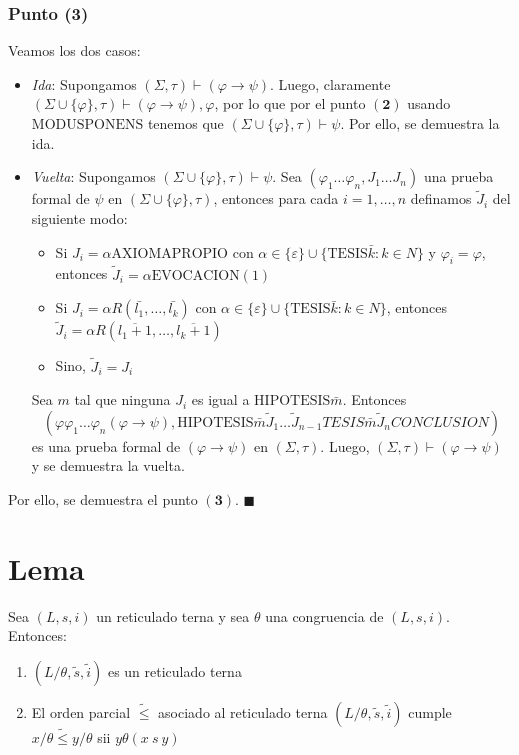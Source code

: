 \documentclass{article}
\begin{document}
\subsubsection*{Punto (3)}
Veamos los dos casos:
\begin{itemize}
  \item \textit{Ida}: Supongamos $(\Sigma,\tau)\vdash(\varphi\to\psi)$. Luego, claramente $(\Sigma\cup\{\varphi\},\tau)\vdash(\varphi\to\psi),\varphi$, por lo que por el punto $\mathbf{(2)}$ usando $\text{MODUSPONENS}$ tenemos que $(\Sigma\cup\{\varphi\},\tau)\vdash\psi$. Por ello, se demuestra la ida.
  \item \textit{Vuelta}: Supongamos $(\Sigma\cup\{\varphi\},\tau)\vdash\psi$. Sea $(\varphi_1\dots\varphi_n,J_1\dots J_n)$ una prueba formal de $\psi$ en $(\Sigma\cup\{\varphi\},\tau)$, entonces para cada $i=1,\dots,n$ definamos $\tilde{J}_i$ del siguiente modo:
        \begin{itemize}
          \item Si $J_i=\alpha\text{AXIOMAPROPIO}$ con $\alpha\in\{\varepsilon\}\cup\{\text{TESIS}\bar{k}:k\in N\}$ y $\varphi_i=\varphi$, entonces $\tilde{J}_i=\alpha\text{EVOCACION}(1)$
          \item Si $J_i=\alpha R(\bar{l_1},\dots,\bar{l_k})$ con $\alpha\in\{\varepsilon\}\cup\{\text{TESIS}\bar{k}:k\in N\}$, entonces $\tilde{J}_i=\alpha R(\overline{l_1+1},\dots,\overline{l_k+1})$
          \item Sino, $\tilde{J}_i=J_i$
        \end{itemize}
        Sea $m$ tal que ninguna $J_i$ es igual a $\text{HIPOTESIS}\bar{m}$. Entonces
        \begin{equation*}
          (\varphi\varphi_1\dots\varphi_n(\varphi\to\psi),\text{HIPOTESIS}\bar{m}\tilde{J}_1\dots\tilde{J}_{n-1}TESIS\bar{m}\tilde{J}_nCONCLUSION)
        \end{equation*}
        es una prueba formal de $(\varphi\to\psi)$ en $(\Sigma,\tau)$. Luego, $(\Sigma,\tau)\vdash(\varphi\to\psi)$ y se demuestra la vuelta.
\end{itemize}

Por ello, se demuestra el punto $\mathbf{(3)}$. $\blacksquare$

\section*{Lema}
Sea $(L,s,i)$ un reticulado terna y sea $\theta$ una congruencia de $(L,s,i)$. Entonces:
\begin{enumerate}
  \item $(L/\theta,\tilde{s},\tilde{i})$ es un reticulado terna
  \item El orden parcial $\tilde{\leq}$ asociado al reticulado terna $(L/\theta,\tilde{s},\tilde{i})$ cumple $x/\theta\tilde{\leq}y/\theta$ sii $y\theta(x\ s\ y)$
\end{enumerate}
\end{document}
